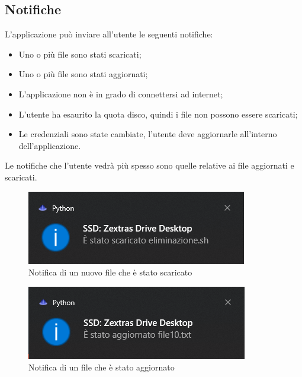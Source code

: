 \subsection{Notifiche}
L'applicazione può inviare all'utente le seguenti notifiche:
\begin{itemize}
    \item Uno o più file sono stati scaricati;
    \item Uno o più file sono stati aggiornati;
    \item L'applicazione non è in grado di connettersi ad internet;
    \item L'utente ha esaurito la quota disco, quindi i file non possono essere scaricati;
    \item Le credenziali sono state cambiate, l'utente deve aggiornarle all'interno dell'applicazione.
\end{itemize}
Le notifiche che l'utente vedrà più spesso sono quelle relative ai file aggiornati e scaricati.
\begin{figure}[H]
    \centering
    \includegraphics[scale = 0.7]{components/img/notifica_download_new_file.png}
    \caption{Notifica di un nuovo file che è stato scaricato}
    \label{fig:impostazioni}
\end{figure}
\begin{figure}[H]
    \centering
    \includegraphics[scale = 0.7]{components/img/notifica_download_update_file.png}
    \caption{Notifica di un file che è stato aggiornato}
    \label{fig:impostazioni}
\end{figure}

